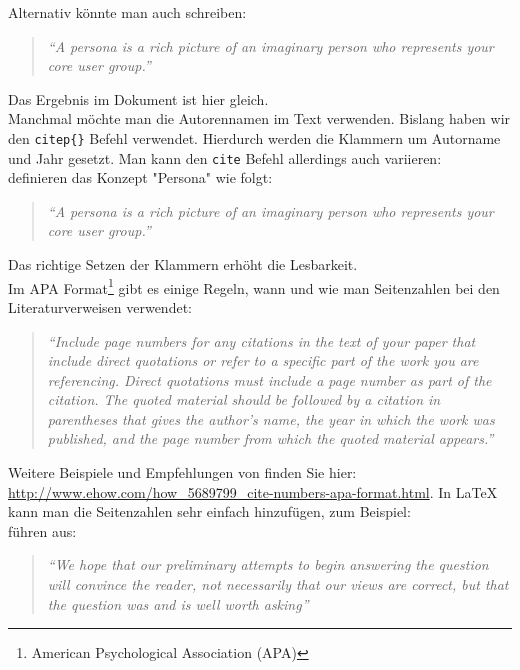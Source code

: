 Alternativ könnte man auch schreiben: 
\begin{quotation}
	\textit{\enquote{A persona is a rich picture of an imaginary person who represents your core user group.}} \citep{Dix04}
\end{quotation}

Das Ergebnis im Dokument ist hier gleich. \\

Manchmal möchte man die Autorennamen im Text verwenden. Bislang haben wir den \texttt{citep\{\}} Befehl verwendet. Hierdurch werden die Klammern um Autorname und Jahr gesetzt. Man kann den \texttt{cite} Befehl allerdings auch variieren: \\

\cite{Dix04} definieren das Konzept "Persona" wie folgt: 
\begin{quotation}
	\emph{``A persona is a rich picture of an imaginary person who represents your core user group.''}
	\citep{Dix04}
\end{quotation}

Das richtige Setzen der Klammern erhöht die Lesbarkeit. \\

Im APA Format\footnote{ American Psychological Association (APA)} gibt es einige Regeln, wann und wie man Seitenzahlen bei den Literaturverweisen verwendet:

\begin{quotation}
	\emph{``Include page numbers for any citations in the text of your paper that include direct quotations or refer to a specific part of the work you are referencing. Direct quotations must include a page number as part of the citation. The quoted material should be followed by a citation in parentheses that gives the author's name, the year in which the work was published, and the page number from which the quoted material appears.''}
	\citep{Hall}
\end{quotation}

Weitere Beispiele und Empfehlungen von \cite{Hall} finden Sie hier:  \url{http://www.ehow.com/how_5689799_cite-numbers-apa-format.html}. In \LaTeX{} kann man die Seitenzahlen sehr einfach hinzufügen, zum Beispiel: \\

\citet[S. 86]{Baddeley:1974ts} führen aus: 

\begin{quotation}
	\emph{``We hope that our preliminary attempts to begin answering the question will convince the reader, not necessarily that our views are correct, but that the question was and is well worth asking''}
	\citep[p. 86]{Baddeley:1974ts}
\end{quotation}

